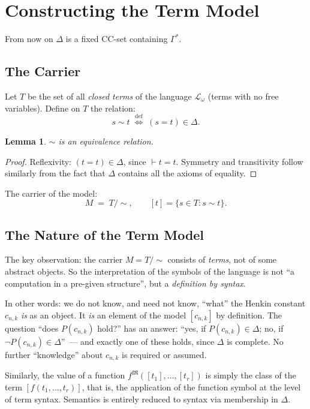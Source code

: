 \documentclass[12pt, a4paper]{article}
\theoremstyle{plain}
\newtheorem{lemma}[theorem]{Lemma}
\theoremstyle{definition}
\newcommand{\proves}{\vdash}
\newcommand{\Lw}{\mathcal{L}_\omega}
\newcommand{\Struct}{\mathfrak{M}}
\begin{document}
\section{Constructing the Term Model}

From now on $\Delta$ is a fixed CC-set containing $\Gamma^*$.

\subsection{The Carrier}

Let $T$ be the set of all \emph{closed terms} of the language $\Lw$
(terms with no free variables). Define on $T$ the relation:
\[
  s \sim t \;\stackrel{\text{def}}{\iff}\; (s = t) \in \Delta.
\]

\begin{lemma}
$\sim$ is an equivalence relation.
\end{lemma}

\begin{proof}
Reflexivity: $(t = t) \in \Delta$, since $\proves t = t$.
Symmetry and transitivity follow similarly from
the fact that $\Delta$ contains all the axioms of equality.
\end{proof}

The carrier of the model:
\[
  M \;=\; T/{\sim}, \qquad [t] = \{s \in T : s \sim t\}.
\]

\subsection{The Nature of the Term Model}

The key observation: the carrier $M = T/{\sim}$ consists of \emph{terms},
not of some abstract objects. So the interpretation of the symbols
of the language is not ``a computation in a pre-given structure'', but
a \emph{definition by syntax}.

In other words: we do not know, and need not know, ``what''
the Henkin constant $c_{n,k}$ \emph{is} as an object. It \emph{is} an element of the model $[c_{n,k}]$
by definition. The question ``does $P(c_{n,k})$ hold?'' has an answer:
``yes, if $P(c_{n,k}) \in \Delta$; no, if $\neg P(c_{n,k}) \in \Delta$''~---
and exactly one of these holds, since $\Delta$ is complete.
No further ``knowledge'' about $c_{n,k}$ is required or assumed.

Similarly, the value of a function $f^{\Struct}([t_1],\ldots,[t_r])$ is simply
the class of the term $[f(t_1,\ldots,t_r)]$, that is, the application of the function symbol
at the level of term syntax. Semantics is entirely reduced to syntax
via membership in $\Delta$.
\end{document}

